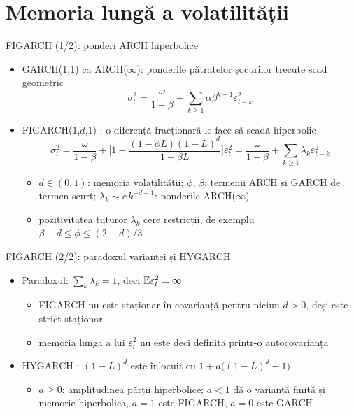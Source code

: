 \section{Memoria lungă a volatilității}

\begin{frame}{FIGARCH (1/2): ponderi ARCH hiperbolice}
\itemsize{\small}
\begin{itemize}
    \item GARCH(1,1) ca ARCH($\infty$): ponderile pătratelor șocurilor trecute scad geometric
    \[ \sigma_t^2 = \frac{\omega}{1 - \beta} + \sum_{k\ge1}\alpha\beta^{k-1}\varepsilon_{t-k}^2 \]
    \item FIGARCH(1,$d$,1) : o diferență fracționară le face să scadă hiperbolic
    \[ \sigma_t^2 = \frac{\omega}{1 - \beta} + \Big[1 - \frac{(1 - \phi L)(1 - L)^d}{1 - \beta L}\Big]\varepsilon_t^2 = \frac{\omega}{1 - \beta} + \sum_{k\ge1}\lambda_k\varepsilon_{t-k}^2 \]
    \begin{itemize}
        \item $d \in (0, 1)$: memoria volatilității; $\phi$, $\beta$: termenii ARCH și GARCH de termen scurt; $\lambda_k \sim c\,k^{-d-1}$: ponderile ARCH($\infty$)
        \item pozitivitatea tuturor $\lambda_k$ cere restricții, de exemplu $\beta - d \le \phi \le (2 - d)/3$
    \end{itemize}
\end{itemize}
\end{frame}

\begin{frame}{FIGARCH (2/2): paradoxul varianței și HYGARCH}
\itemsize{\small}
\begin{itemize}
    \item Paradoxul: $\sum_k\lambda_k = 1$, deci $\mathbb{E}\varepsilon_t^2 = \infty$
    \begin{itemize}
        \item FIGARCH nu este staționar în covarianță pentru niciun $d > 0$, deși este strict staționar
        \item memoria lungă a lui $\varepsilon_t^2$ nu este deci definită printr-o autocovarianță
    \end{itemize}
    \item HYGARCH : $(1 - L)^d$ este înlocuit cu $1 + a\big((1 - L)^d - 1\big)$
    \begin{itemize}
        \item $a \ge 0$: amplitudinea părții hiperbolice; $a < 1$ dă o varianță finită și memorie hiperbolică, $a = 1$ este FIGARCH, $a = 0$ este GARCH
    \end{itemize}
\end{itemize}
\end{frame}

